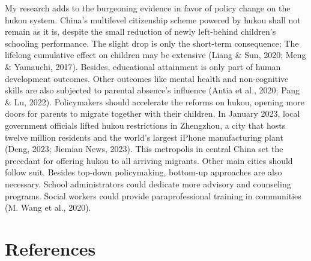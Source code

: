 \documentclass[
  man,floatsintext]{apa7}
\begin{document}
My research adds to the burgeoning evidence in favor of policy change on the hukou system. China's multilevel citizenship scheme powered by hukou shall not remain as it is, despite the small reduction of newly left-behind children's schooling performance. The slight drop is only the short-term consequence; The lifelong cumulative effect on children may be extensive (Liang \& Sun, 2020; Meng \& Yamauchi, 2017). Besides, educational attainment is only part of human development outcomes. Other outcomes like mental health and non-cognitive skills are also subjected to parental absence's influence (Antia et al., 2020; Pang \& Lu, 2022). Policymakers should accelerate the reforms on hukou, opening more doors for parents to migrate together with their children. In January 2023, local government officials lifted hukou restrictions in Zhengzhou, a city that hosts twelve million residents and the world's largest iPhone manufacturing plant (Deng, 2023; Jiemian News, 2023). This metropolis in central China set the precedant for offering hukou to all arriving migrants. Other main cities should follow suit. Besides top-down policymaking, bottom-up approaches are also necessary. School administrators could dedicate more advisory and counseling programs. Social workers could provide paraprofessional training in communities (M. Wang et al., 2020).

\newpage

\hypertarget{references}{%
\section{References}\label{references}}
\end{document}
